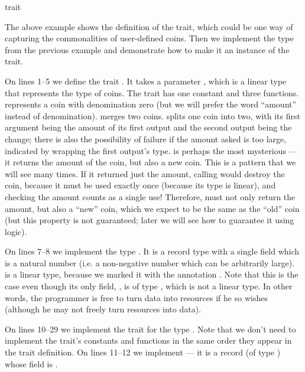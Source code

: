 \begin{example}{ trait}



\end{example}

The above example shows the definition of the  trait, which could be one way of capturing the commonalities of user-defined coins. Then we implement the type  from the previous example and demonstrate how to make it an instance of the  trait.

On lines 1--5 we define the trait . It takes a parameter , which is a linear type that represents the type of coins. The trait has one constant and three functions.  represents a coin with denomination zero (but we will prefer the word ``amount'' instead of denomination).  merges two coins.  splits one coin into two, with its first argument being the amount of its first output and the second output being the change; there is also the possibility of failure if the amount asked is too large, indicated by  wrapping the first output's type.  is perhaps the most mysterious --- it returns the amount of the coin, but also a new coin. This is a pattern that we will see many times. If it returned just the amount, calling  would destroy the coin, because it must be used exactly once (because its type is linear), and checking the amount counts as a single use! Therefore,  must not only return the amount, but also a ``new'' coin, which we expect to be the same as the ``old'' coin (but this property is not guaranteed; later we will see how to guarantee it using logic).

On lines 7--8 we implement the type . It is a record type with a single field  which is a natural number (i.e. a non-negative number which can be arbitrarily large).  is a linear type, because we marked it with the annotation . Note that this is the case even though its only field, , is of type , which is not a linear type. In other words, the programmer is free to turn data into resources if he so wishes (although he may not freely turn resources into data).

On lines 10--29 we implement the trait  for the type . Note that we don't need to implement the trait's constants and functions in the same order they appear in the trait definition. On lines 11--12 we implement  --- it is a record (of type ) whose  field is .

